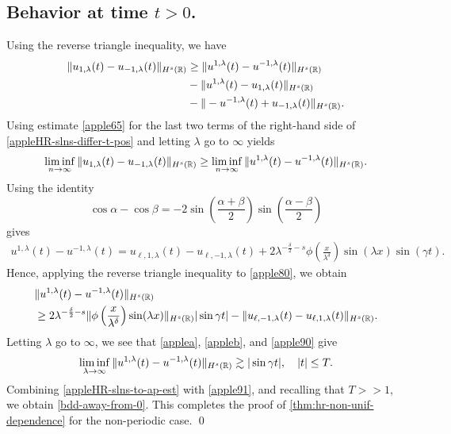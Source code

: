 \subsection*{Behavior at time  $t>0$.}  Using the reverse triangle inequality, we 
have
%
%
%
%
%
\begin{equation} \label{appleHR-slns-differ-t-pos}
\begin{split}
\|
u_{1,\lambda}(t)
-
u_{- 1,\lambda}(t)
\|_{H^s(\mathbb{R})}
&
\ge
\|
u^{1,\lambda}(t)
-
u^{- 1,\lambda}(t)
\|_{H^s(\mathbb{R})}
\\
& -
\|
u^{1,\lambda}(t)
-
u_{1,\lambda}(t)
\|_{H^s(\mathbb{R})}
\\
& -
\|
-u^{-1,\lambda}(t)
+
u_{-1,\lambda}(t)
\|_{H^s(\mathbb{R})}.
\end{split}
\end{equation}
%
%
%
%
Using estimate \eqref{apple65} for the last two terms of 
the right-hand side of \eqref{appleHR-slns-differ-t-pos} 
and letting $\lambda$ go to $\infty$ 
yields
%
%
%
\begin{equation} \label{appleHR-slns-to-ap-est}
\liminf_{n\to\infty}
\|
u_{1,\lambda}(t)
-
u_{- 1,\lambda}(t)
\|_{H^s(\mathbb{R})}
\ge
\liminf_{n\to\infty}
\|
u^{1,\lambda}(t)
-
u^{- 1,\lambda}(t)
\|_{H^s(\mathbb{R})}.
\end{equation}
%
%
%
%
Using the identity $$
\cos \alpha -\cos \beta
=
-2
\sin(\frac{\alpha + \beta}{2})
\sin(\frac{\alpha - \beta}{2})
$$
gives
%
%
\begin{equation}
\label{apple80}
\begin{split}
u^{1,\lambda}(t)
-
u^{- 1,\lambda}(t)
=
u_{\ell,1,\lambda}(t) - u_{\ell,-1,\lambda}(t) + 
2\lambda^{-\frac{\delta}{2}-s}
\phi\left( \frac{x}{\lambda^\delta} \right)\sin(\lambda x) \sin(\gamma t).
\end{split}
\end{equation}
%
%
%
Hence, applying the reverse triangle inequality to \eqref{apple80}, we 
obtain
%
%
\begin{equation} \label{apple90}
\begin{split}
& \|
u^{1,\lambda}(t)
-
u^{- 1,\lambda}(t)
\|_{H^s(\mathbb{R})}
\\
& \ge 2 \lambda^{-\frac{\delta}{2}-s} \|\phi\left(
\frac{x}{\lambda^\delta} \right) \sin(\lambda x) \|_{H^s(\mathbb{R})} |\sin \gamma 
t|
- \|u_{\ell,-1,\lambda}(t) - u_{\ell,1,\lambda}(t)\|_{H^s(\mathbb{R})}.
\end{split}
\end{equation}
%
%
%
%
Letting $\lambda$ go to $\infty$, we see that \cref{applea}, \cref{appleb}, and \eqref{apple90} give
%
%
%
%
\begin{equation} \label{apple91}
\liminf_{\lambda \to\infty}
\|
u^{1,\lambda}(t)
-
u^{- 1,\lambda}(t)
\|_{H^s(\mathbb{R})}
\gtrsim
|\sin \gamma t|, \quad |t| \le T.
\end{equation}
%
%
Combining \eqref{appleHR-slns-to-ap-est} with \eqref{apple91}, and 
recalling that $T >>1$, we obtain \eqref{bdd-away-from-0}. This completes 
the proof of \cref{thm:hr-non-unif-dependence} for the
non-periodic case.  \qed
%
%
%
%
%
%
%
%
